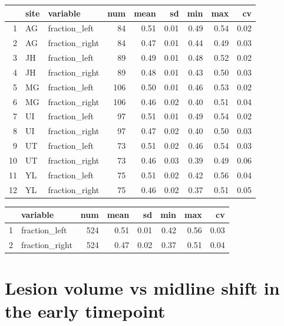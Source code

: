 \documentclass[
]{article}
\begin{document}
\begin{table}[ht]
\centering
\begin{tabular}{rllrrrrrr}
  \hline
 & site & variable & num & mean & sd & min & max & cv \\ 
  \hline
1 & AG & fraction\_left &  84 & 0.51 & 0.01 & 0.49 & 0.54 & 0.02 \\ 
  2 & AG & fraction\_right &  84 & 0.47 & 0.01 & 0.44 & 0.49 & 0.03 \\ 
  3 & JH & fraction\_left &  89 & 0.49 & 0.01 & 0.48 & 0.52 & 0.02 \\ 
  4 & JH & fraction\_right &  89 & 0.48 & 0.01 & 0.43 & 0.50 & 0.03 \\ 
  5 & MG & fraction\_left & 106 & 0.50 & 0.01 & 0.46 & 0.53 & 0.02 \\ 
  6 & MG & fraction\_right & 106 & 0.46 & 0.02 & 0.40 & 0.51 & 0.04 \\ 
  7 & UI & fraction\_left &  97 & 0.51 & 0.01 & 0.49 & 0.54 & 0.02 \\ 
  8 & UI & fraction\_right &  97 & 0.47 & 0.02 & 0.40 & 0.50 & 0.03 \\ 
  9 & UT & fraction\_left &  73 & 0.51 & 0.02 & 0.46 & 0.54 & 0.03 \\ 
  10 & UT & fraction\_right &  73 & 0.46 & 0.03 & 0.39 & 0.49 & 0.06 \\ 
  11 & YL & fraction\_left &  75 & 0.51 & 0.02 & 0.42 & 0.56 & 0.04 \\ 
  12 & YL & fraction\_right &  75 & 0.46 & 0.02 & 0.37 & 0.51 & 0.05 \\ 
   \hline
\end{tabular}
\end{table}
\begin{table}[ht]
\centering
\begin{tabular}{rlrrrrrr}
  \hline
 & variable & num & mean & sd & min & max & cv \\ 
  \hline
1 & fraction\_left & 524 & 0.51 & 0.01 & 0.42 & 0.56 & 0.03 \\ 
  2 & fraction\_right & 524 & 0.47 & 0.02 & 0.37 & 0.51 & 0.04 \\ 
   \hline
\end{tabular}
\end{table}

\hypertarget{lesion-volume-vs-midline-shift-in-the-early-timepoint}{%
\section{Lesion volume vs midline shift in the early
timepoint}\label{lesion-volume-vs-midline-shift-in-the-early-timepoint}}
\end{document}
